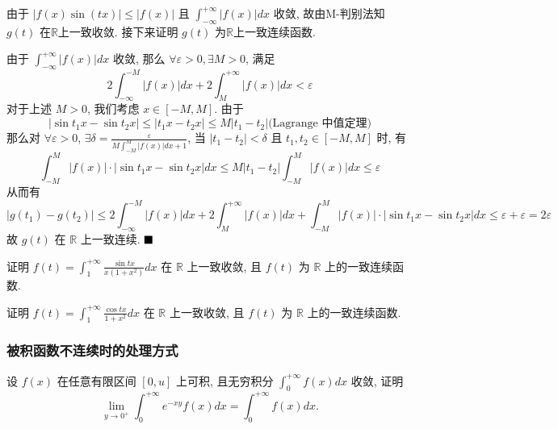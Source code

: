 \documentclass[lang=cn,newtx,10pt,scheme=chinese]{elegantbook}
\begin{document}
\begin{solution}
    由于 $|f(x)\sin(tx)| \le |f(x)|$ 且 $\int_{-\infty}^{+\infty} |f(x)|dx$ 收敛, 故由M-判别法知 $g(t)$ 在$\mathbb R$上一致收敛.
接下来证明 $g(t)$ 为$\mathbb R$上一致连续函数.

由于 $\int_{-\infty}^{+\infty} |f(x)|dx$ 收敛, 那么 $\forall \varepsilon>0, \exists M>0$, 满足
$$ 2\int_{-\infty}^{-M} |f(x)|dx + 2\int_{M}^{+\infty} |f(x)|dx < \varepsilon $$
对于上述 $M>0$, 我们考虑 $x \in [-M, M]$.
由于 $$|\sin t_1x - \sin t_2x| \le |t_1x - t_2x| \le M|t_1-t_2| \text{(Lagrange 中值定理)}$$ 
那么对 $\forall \varepsilon>0$, $\exists \delta = \frac{\varepsilon}{M\int_{-M}^{M}|f(x)|dx+1}$, 当 $|t_1-t_2|<\delta$ 且 $t_1, t_2 \in [-M, M]$ 时, 有
$$ \int_{-M}^{M} |f(x)| \cdot |\sin t_1x - \sin t_2x| dx \le M|t_1-t_2|\int_{-M}^{M} |f(x)|dx \le \varepsilon $$
从而有
$$ |g(t_1)-g(t_2)| \le 2\int_{-\infty}^{-M} |f(x)|dx + 2\int_{M}^{+\infty} |f(x)|dx + \int_{-M}^{M} |f(x)| \cdot |\sin t_1x - \sin t_2x| dx \le \varepsilon + \varepsilon = 2\varepsilon $$
故 $g(t)$ 在 $\mathbb{R}$ 上一致连续. $\hfill \blacksquare$

\end{solution}
\begin{exercise}[特例 1]
证明 $f(t) = \int_{1}^{+\infty} \frac{\sin tx}{x(1+x^2)} dx$ 在 $\mathbb{R}$ 上一致收敛, 且 $f(t)$ 为 $\mathbb{R}$ 上的一致连续函数.
\end{exercise}

\begin{exercise}[特例 2]
证明 $f(t) = \int_{1}^{+\infty} \frac{\cos tx}{1+x^2} dx$ 在 $\mathbb{R}$ 上一致收敛, 且 $f(t)$ 为 $\mathbb{R}$ 上的一致连续函数.
\end{exercise}

\subsubsection*{被积函数不连续时的处理方式}
\begin{example}
设 $f(x)$ 在任意有限区间 $[0, u]$ 上可积, 且无穷积分 $\int_{0}^{+\infty} f(x) dx$ 收敛, 证明
$$ \lim\limits_{y \to 0^+} \int_{0}^{+\infty} e^{-xy} f(x) dx = \int_{0}^{+\infty} f(x) dx. $$
\end{example}
\end{document}
